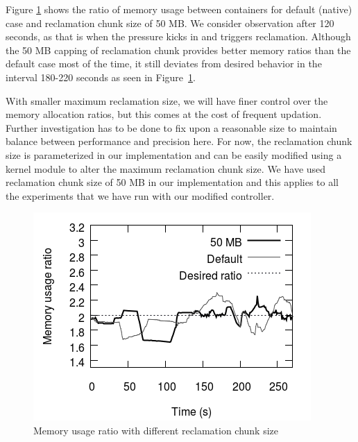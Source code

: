 Figure \ref{mem_ratio} shows the ratio of memory usage between \mongodb{} containers for default (native) case and reclamation
chunk size of 50 MB. We consider observation after 120 seconds, as that is when the pressure kicks in and triggers 
reclamation. Although the 50 MB capping of reclamation chunk provides better memory ratios than the default case most of
the time, it still deviates from desired behavior in the interval 180-220 seconds as seen in Figure~\ref{mem_ratio}. 

With smaller maximum reclamation size, we will have finer control over the memory allocation ratios, but this 
comes at the cost of frequent updation. Further investigation has to be done to fix upon a reasonable size to 
maintain balance between performance and precision here. For now, the reclamation chunk size is parameterized in our implementation and can 
be easily modified using a kernel module to alter the maximum reclamation chunk size. We have used reclamation chunk size of 50 MB in our 
implementation and this applies to all the experiments that we have run with our modified controller.

\begin{figure}
  \centering
  \includegraphics[scale=0.7]{images/mem_sol/memory_ratio.png}
  \caption{\footnotesize Memory usage ratio with different reclamation chunk size}
  \label{mem_ratio}
\end{figure}